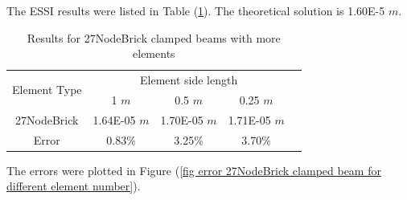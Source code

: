 \documentclass[fleqn,11pt]{article}
\begin{document}
The ESSI results were listed in Table (\ref{table Results for 27NodeBrick clamped beams with more elements}). 
The theoretical solution is 1.60E-5 $m$. 

\begin{table}[H]
  \centering
  \caption{Results for 27NodeBrick clamped beams with more elements}
  \label{table Results for 27NodeBrick clamped beams with more elements}
  \begin{tabular}{|c|c|c|c|c|}
    \hline 
    \multirow{2}{*}{Element Type} 
       & \multicolumn{3}{|c|}{Element side length} \\ \cline{2-4}
       & 1 $m$ & 0.5 $m$ & 0.25 $m$ \\                              \hline
27NodeBrick & 1.64E-05 $m$  & 1.70E-05 $m$ & 1.71E-05 $m$ \\ \hline
Error       & 0.83\%   & 3.25\%   & 3.70\%     \\ \hline
  \end{tabular}
\end{table}







The errors were plotted in Figure (\ref{fig error 27NodeBrick clamped beam for different element number}).
\end{document}
